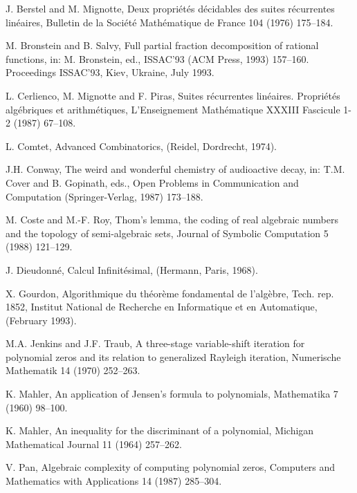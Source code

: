 \begin{thebibliography}{10}
\begin{small}
\itemsep=0pt
\parskip=0pt
J. Berstel and M. Mignotte,
Deux propri{\'e}t{\'e}s d{\'e}cidables des suites r{\'e}currentes
  lin{\'e}aires,
Bulletin de la Soci{\'e}t{\'e} Math{\'e}matique de France 104
  (1976) 175--184.

M. Bronstein and B. Salvy,
Full partial fraction decomposition of rational functions, in: M.
Bronstein, ed., ISSAC'93 (ACM Press, 1993) 157--160. Proceedings
ISSAC'93, Kiev, Ukraine, July 1993.

L. Cerlienco, M. Mignotte and F. Piras,
Suites r{\'e}currentes lin{\'e}aires. {P}ropri{\'e}t{\'e}s
  alg{\'e}briques et arithm{\'e}tiques,
L'Enseignement Math{\'e}matique XXXIII Fascicule 1-2 (1987) 67--108.

L. Comtet,
Advanced Combinatorics,
(Reidel, Dordrecht, 1974).

J.H. Conway,
The weird and wonderful chemistry of audioactive decay,
in: T.M. Cover and B. Gopinath, eds., Open Problems in Communication
and Computation (Springer-Verlag, 1987) 173--188.

M. Coste and M.-F. Roy,
Thom's lemma, the coding of real algebraic numbers and the topology
  of semi-algebraic sets,
Journal of Symbolic Computation 5 (1988) 121--129.

J. Dieudonn{\'e},
Calcul Infinit{\'e}simal,
(Hermann, Paris, 1968).

X. Gourdon,
Algorithmique du th\'eor\`eme fondamental de l'alg\`ebre,
Tech. rep. 1852, Institut National de Recherche en Informatique et en
  Automatique, (February 1993).

M.A. Jenkins and J.F. Traub,
A three-stage variable-shift iteration for polynomial zeros and its
  relation to generalized {R}ayleigh iteration,
Numerische Mathematik 14 (1970) 252--263.

K. Mahler,
An application of {J}ensen's formula to polynomials,
Mathematika 7 (1960) 98--100.

K. Mahler,
An inequality for the discriminant of a polynomial,
Michigan Mathematical Journal 11 (1964) 257--262.

V. Pan,
Algebraic complexity of computing polynomial zeros,
Computers and Mathematics with Applications 14 (1987)
  285--304.


\end{small}
\end{thebibliography}
